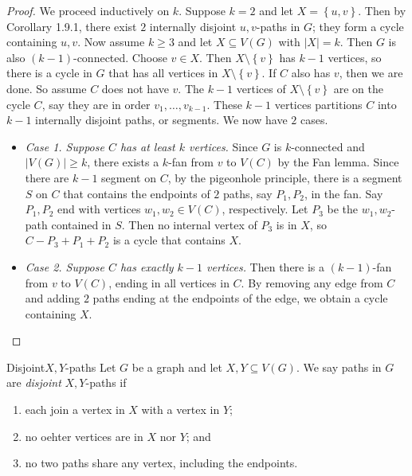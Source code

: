 \documentclass[co342]{subfiles}
\begin{document}
    \begin{proof}
        We proceed inductively on $k$. Suppose $k=2$ and let $X= \left\lbrace u,v \right\rbrace$. Then by Corollary 1.9.1, there exist $2$ internally disjoint $u,v$-paths in $G$; they form a cycle containing $u,v$. Now assume $k\geq 3$ and let $X\subseteq V\left( G \right)$ with $\left| X \right|=k$. Then $G$ is also $\left( k-1 \right)$-connected. Choose $v\in X$. Then $X\setminus \left\lbrace v \right\rbrace$ has $k-1$ vertices, so there is a cycle in $G$ that has all vertices in $X\setminus \left\lbrace v \right\rbrace$. If $C$ also has $v$, then we are done. So assume $C$ does not have $v$. The $k-1$ vertices of $X\setminus \left\lbrace v \right\rbrace$ are on the cycle $C$, say they are in order $v_1,\ldots,v_{k-1}$. These $k-1$ vertices partitions $C$ into $k-1$ internally disjoint paths, or segments. We now have $2$ cases.
        \begin{itemize}
            \item \textit{Case 1. Suppose $C$ has at least $k$ vertices.} Since $G$ is $k$-connected and $\left| V\left( G \right) \right|\geq k$, there exists a $k$-fan from $v$ to $V\left( C \right)$ by the Fan lemma. Since there are $k-1$ segment on $C$, by the pigeonhole principle, there is a segment $S$ on $C$ that contains the endpoints of $2$ paths, say $P_1,P_2$, in the fan. Say $P_1,P_2$ end with vertices $w_1,w_2\in V\left( C \right)$, respectively. Let $P_3$ be the $w_1,w_2$-path contained in $S$. Then no internal vertex of $P_3$ is in $X$, so $C-P_3+P_1+P_2$ is a cycle that contains $X$.
            \item \textit{Case 2. Suppose $C$ has exactly $k-1$ vertices.} Then there is a $\left( k-1 \right)$-fan from $v$ to $V\left( C \right)$, ending in all vertices in $C$. By removing any edge from $C$ and adding $2$ paths ending at the endpoints of the edge, we obtain a cycle containing $X$. \qqedsym
        \end{itemize} 
    \end{proof}

    \begin{definition}{Disjoint}{$X,Y$-paths}
        Let $G$ be a graph and let $X,Y\subseteq V\left( G \right)$. We say paths in $G$ are \emph{disjoint} $X,Y$-paths if 
        \begin{enumerate}
            \item each join a vertex in $X$ with a vertex in $Y$;
            \item no oehter vertices are in $X$ nor $Y$; and
            \item no two paths share any vertex, including the endpoints.
        \end{enumerate}
    \end{definition}
\end{document}
